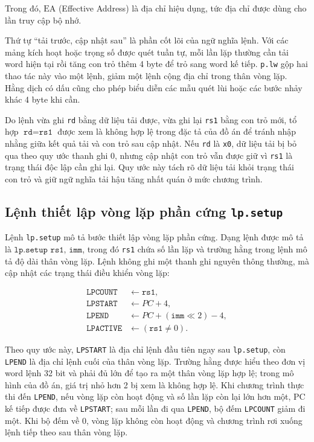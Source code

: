 \documentclass[../DoAn.tex]{subfiles}
\begin{document}
Trong đó, \(\mathrm{EA}\) (Effective Address) là địa chỉ hiệu dụng, tức địa chỉ được dùng cho lần truy cập bộ nhớ.

Thứ tự ``tải trước, cập nhật sau'' là phần cốt lõi của ngữ nghĩa lệnh. Với các mảng kích hoạt hoặc trọng số được quét tuần tự, mỗi lần lặp thường cần tải word hiện tại rồi tăng con trỏ thêm 4 byte để trỏ sang word kế tiếp. \texttt{p.lw} gộp hai thao tác này vào một lệnh, giảm một lệnh cộng địa chỉ trong thân vòng lặp. Hằng dịch có dấu cũng cho phép biểu diễn các mẫu quét lùi hoặc các bước nhảy khác 4 byte khi cần.

Do lệnh vừa ghi \texttt{rd} bằng dữ liệu tải được, vừa ghi lại \texttt{rs1} bằng con trỏ mới, tổ hợp \(\texttt{rd}=\texttt{rs1}\) được xem là không hợp lệ trong đặc tả của đồ án để tránh nhập nhằng giữa kết quả tải và con trỏ sau cập nhật. Nếu \texttt{rd} là \texttt{x0}, dữ liệu tải bị bỏ qua theo quy ước thanh ghi 0, nhưng cập nhật con trỏ vẫn được giữ vì \texttt{rs1} là trạng thái độc lập cần ghi lại. Quy ước này tách rõ dữ liệu tải khỏi trạng thái con trỏ và giữ ngữ nghĩa tải hậu tăng nhất quán ở mức chương trình.

\subsection{Lệnh thiết lập vòng lặp phần cứng \texttt{lp.setup}}
\label{subsec:dac-ta-lp-setup}

Lệnh \texttt{lp.setup} mô tả bước thiết lập vòng lặp phần cứng. Dạng lệnh được mô tả là \(\texttt{lp.setup rs1, imm}\), trong đó \texttt{rs1} chứa số lần lặp và trường hằng trong lệnh mô tả độ dài thân vòng lặp. Lệnh không ghi một thanh ghi nguyên thông thường, mà cập nhật các trạng thái điều khiển vòng lặp:

\begin{equation}
    \begin{aligned}
        \texttt{LPCOUNT} &\leftarrow \texttt{rs1}, \\
        \texttt{LPSTART} &\leftarrow PC + 4, \\
        \texttt{LPEND} &\leftarrow PC + (\texttt{imm} \ll 2) - 4, \\
        \texttt{LPACTIVE} &\leftarrow (\texttt{rs1} \ne 0).
    \end{aligned}
    \label{eq:lpsetup-semantics}
\end{equation}

Theo quy ước này, \texttt{LPSTART} là địa chỉ lệnh đầu tiên ngay sau \texttt{lp.setup}, còn \texttt{LPEND} là địa chỉ lệnh cuối của thân vòng lặp. Trường hằng được hiểu theo đơn vị word lệnh 32 bit và phải đủ lớn để tạo ra một thân vòng lặp hợp lệ; trong mô hình của đồ án, giá trị nhỏ hơn 2 bị xem là không hợp lệ. Khi chương trình thực thi đến \texttt{LPEND}, nếu vòng lặp còn hoạt động và số lần lặp còn lại lớn hơn một, PC kế tiếp được đưa về \texttt{LPSTART}; sau mỗi lần đi qua \texttt{LPEND}, bộ đếm \texttt{LPCOUNT} giảm đi một. Khi bộ đếm về 0, vòng lặp không còn hoạt động và chương trình rơi xuống lệnh tiếp theo sau thân vòng lặp.
\end{document}
